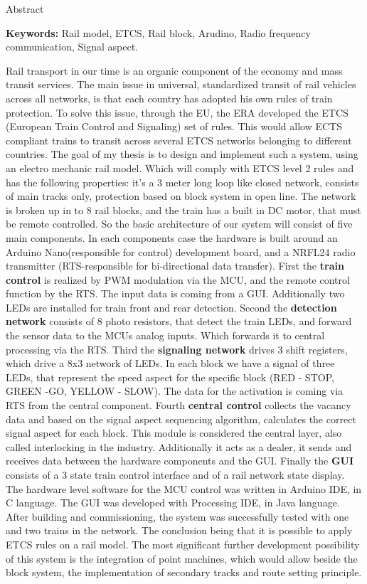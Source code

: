 \documentclass[a4paper,12pt]{article}
\begin{document}
\newpage
\pagestyle{empty}
\begin{center}
    {\LARGE Abstract}
\end{center}
\textbf{Keywords:} Rail model, ETCS, Rail block, Arudino, Radio frequency communication, Signal aspect.

Rail transport in our time is an organic component of the economy and mass transit services. 
The main issue in universal, standardized transit of rail vehicles across all networks, is that each country has adopted his own rules of train protection.
To solve this issue, through the EU, the ERA developed the ETCS (European Train Control and Signaling) set of rules.
This would allow ECTS compliant trains to transit across several ETCS networks belonging to different countries.
The goal of my thesis is to design and implement such a system, using an electro mechanic rail model.
Which will comply with ETCS level 2 rules and has the following properties: it's a 3 meter long loop like closed network, consists of main tracks only, protection based on block system in open line.
The network is broken up in to 8 rail blocks, and the train has a built in DC motor, that must be remote controlled.
So the basic architecture of our system will consist of five main components. In each components case the hardware is built around an Arduino Nano(responsible for control) development board, and a NRFL24 radio transmitter (RTS-responsible for bi-directional data transfer).
First the \textbf{train control} is realized by PWM modulation via the MCU, and the remote control function by the RTS. The input data is coming from a GUI. Additionally two LEDs are installed for train front and rear detection.
Second the \textbf{detection network} consists of 8 photo resistors, that detect the train LEDs, and forward the sensor data to the MCUs analog inputs. Which forwards it to central processing via the RTS.
Third the \textbf{signaling network} drives 3 shift registers, which drive a 8x3 network of LEDs. In each block we have a signal of three LEDs, that represent the speed aspect for the specific block (RED - STOP, GREEN -GO, YELLOW - SLOW).
The data for the activation is coming via RTS from the central component. Fourth \textbf{central control} collects the vacancy data and based on the signal aspect sequencing algorithm, calculates the correct signal aspect for each block. 
This module is considered the central layer, also called interlocking in the industry. Additionally it acts as a dealer, it sends and receives data between the hardware components and the GUI. 
Finally the \textbf{GUI}  consists of a 3 state train control interface and of a rail network state display. 
The hardware level software for the MCU control was written in Arduino IDE, in C language. 
The GUI was developed with Processing IDE, in Java language.
After building and commissioning, the system was successfully tested with one and two trains in the network.
The conclusion being that it is possible to apply ETCS rules on a rail model.
The most significant further development possibility of this system is the integration of point machines, which would allow beside the block system, the implementation of secondary tracks and route setting principle.	
\newpage
\end{document}
